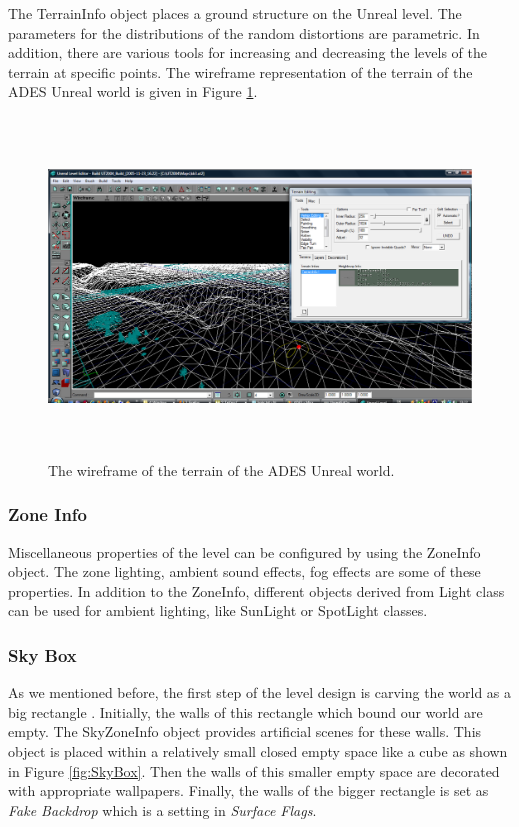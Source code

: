\documentclass[a4paper,oneside,12pt]{report}
\begin{document}
The TerrainInfo object places a ground structure on the Unreal level. The parameters for the distributions of the random distortions are parametric. In addition, there are various tools for increasing and decreasing the levels of the terrain at specific points. The wireframe representation of the terrain of the ADES Unreal world is given in Figure \ref{fig:Terrain}.

\begin{figure}[ht]
\begin{center}
\includegraphics[width=150mm,height=90mm]{img/Terrain.eps}
\caption{The wireframe of the terrain of the ADES Unreal world.}
\label{fig:Terrain}
\end{center}
\end{figure}

\subsubsection{Zone Info}

Miscellaneous properties of the level can be configured by using the ZoneInfo object. The zone lighting, ambient sound effects, fog effects are some of these properties. In addition to the ZoneInfo, different objects derived from Light class can be used for ambient lighting, like SunLight or SpotLight classes.

\subsubsection{Sky Box}

As we mentioned before, the first step of the level design is carving the world as a big rectangle . Initially, the walls of this rectangle which bound our world are empty. The SkyZoneInfo object provides artificial scenes for these walls. This object is placed within a relatively small closed empty space like a cube as shown in Figure \ref{fig:SkyBox}. Then the walls of this smaller empty space are decorated with appropriate wallpapers. Finally, the walls of the bigger rectangle is set as \textit{Fake Backdrop} which is a setting in \textit{Surface Flags}.
\end{document}

